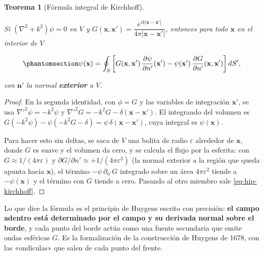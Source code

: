 \documentclass[
  spanish,
  a4paper,
]{scrbook}
\theoremstyle{definition}
\theoremstyle{plain}
\theoremstyle{definition}
\theoremstyle{plain}
\newtheorem{theorem}{Teorema}[chapter]
\theoremstyle{definition}
\theoremstyle{remark}
\begin{document}
\begin{theorem}[Fórmula integral de
Kirchhoff]\protect\hypertarget{thm-hip-kirchhoff}{}\label{thm-hip-kirchhoff}

Si \((\nabla^2+k^2)\psi = 0\) en \(V\) y
\(G(\mathbf x,\mathbf x') = \dfrac{e^{ik|\mathbf x-\mathbf x'|}}{4\pi|\mathbf x-\mathbf x'|}\),
entonces para todo \(\mathbf x\) en el interior de \(V\)

\begin{equation}\protect\phantomsection\label{eq-hip-kirchhoff}{
\psi(\mathbf x) = \oint_S\left[G(\mathbf x,\mathbf x')\,\frac{\partial\psi}{\partial n'}(\mathbf x') - \psi(\mathbf x')\,\frac{\partial G}{\partial n'}(\mathbf x,\mathbf x')\right]dS',
}\end{equation}

con \(\mathbf n'\) la normal \textbf{exterior} a \(V\).

\end{theorem}

\begin{proof}
En la segunda identidad, con \(\phi = G\) y las variables de integración
\(\mathbf x'\), se usa \(\nabla'^2\psi = -k^2\psi\) y
\(\nabla'^2G = -k^2G - \delta(\mathbf x-\mathbf x')\). El integrando del
volumen es
\(G(-k^2\psi) - \psi(-k^2G - \delta) = \psi\,\delta(\mathbf x-\mathbf x')\),
cuya integral es \(\psi(\mathbf x)\).

Para hacer esto sin deltas, se saca de \(V\) una bolita de radio
\(\varepsilon\) alrededor de \(\mathbf x\), donde \(G\) es suave y el
volumen da cero, y se calcula el flujo por la esferita: con
\(G\approx1/(4\pi\varepsilon)\) y
\(\partial G/\partial n'\approx+1/(4\pi\varepsilon^2)\) (la normal
exterior a la región que queda apunta hacia \(\mathbf x\)), el término
\(-\psi\,\partial_{n'}G\) integrado sobre un área \(4\pi\varepsilon^2\)
tiende a \(-\psi(\mathbf x)\) y el término con \(G\) tiende a cero.
Pasando al otro miembro sale \ref{eq-hip-kirchhoff}.
\end{proof}

Lo que dice la fórmula es el principio de Huygens escrito con precisión:
\textbf{el campo adentro está determinado por el campo y su derivada
normal sobre el borde}, y cada punto del borde actúa como una fuente
secundaria que emite ondas esféricas \(G\). Es la formalización de la
construcción de Huygens de 1678, con las «ondículas» que salen de cada
punto del frente.
\end{document}
